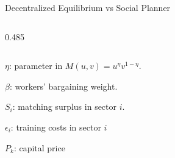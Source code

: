 \documentclass[9pt,xcolor={svgnames}]{beamer}
\begin{document}
\begin{frame}{Decentralized Equilibrium vs Social Planner}
\begin{columns}[T,onlytextwidth]
\begin{column}{0.485\textwidth}
\end{column}
\end{columns}

\vspace{1em}
 $\eta$: parameter in  $M(u,v)=u^\eta v^{1-\eta}$.

$\beta$: workers' bargaining weight.

 $S_i$: matching surplus in sector $i$.

 $\epsilon_i$: training costs in sector $i$

 $P_k$: capital price
\vspace{5em}




\end{frame}

















\end{document}
